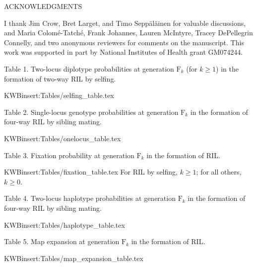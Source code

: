 \documentclass[12pt,letterpaper]{article}
\begin{document}
\clearpage

\centerline{ACKNOWLEDGMENTS} 

I thank Jim Crow, Bret Larget, and Timo Sepp\"al\"ainen for
valuable discussions, and Maria Colom\'e-Tatch\'e, Frank Johannes, 
Lauren McIntyre, Tracey DePellegrin Connelly, and
two anonymous reviewers for comments on
the manuscript.  This work was supported in part by
National Institutes of Health grant GM074244.



\clearpage

\renewcommand*{\refname}{\centerline{\normalsize\rm LITERATURE CITED}}



\newpage

\noindent Table 1. Two-locus diplotype probabilities at generation $\text{F}_k$
(for $k \ge 1$) in the formation of two-way RIL by selfing.

\bigskip

KWBinsert:Tables/selfing_table.tex

\newpage

\noindent Table 2. Single-locus genotype probabilities at generation $\text{F}_k$
in the formation of four-way RIL by sibling mating.

\bigskip

{\footnotesize
\renewcommand{\arraystretch}{1.3}
KWBinsert:Tables/onelocus_table.tex
}

\newpage

\noindent Table 3. Fixation probability at generation $\text{F}_k$
in the formation of RIL.

\bigskip

KWBinsert:Tables/fixation_table.tex
For RIL by selfing, $k \ge 1$; for all others, $k \ge 0$.

\newpage

\begin{landscape}
\noindent Table 4. Two-locus haplotype probabilities at generation $\text{F}_k$
in the formation of four-way RIL by sibling mating.

\bigskip

KWBinsert:Tables/haplotype_table.tex
\end{landscape}

\newpage

\noindent Table 5. Map expansion at generation $\text{F}_k$
in the formation of RIL.

\bigskip

KWBinsert:Tables/map_expansion_table.tex
\end{document}

